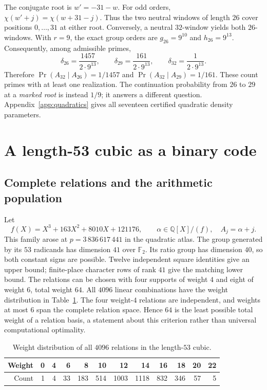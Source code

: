 \documentclass[11pt]{article}
\theoremstyle{definition}\newtheorem{definition}[theorem]{Definition}
\newcommand{\Q}{\mathbb Q}
\newcommand{\Ftwo}{\mathbb F_2}
\newcommand{\Prob}{\operatorname{Pr}}
\begin{document}
The conjugate root is $w'=-31-w$. For odd orders,
$\chi(w'+j)=\chi(w+31-j)$. Thus the two neutral windows of length
$26$ cover positions $0,\ldots,31$ at either root. Conversely, a
neutral $32$-window yields both $26$-windows. With $r=9$, the exact
group orders are $g_{26}=9^{10}$ and $h_{26}=9^{13}$. Consequently,
among admissible primes,
\[
 \delta_{26}=\frac{1457}{2\cdot9^{13}},\qquad
 \delta_{29}=\frac{161}{2\cdot9^{13}},\qquad
 \delta_{32}=\frac1{2\cdot9^{13}}.
\]
Therefore $\Prob(A_{32}\mid A_{26})=1/1457$ and
$\Prob(A_{32}\mid A_{29})=1/161$. These count primes with at least
one realization. The continuation probability from $26$ to $29$
at a \emph{marked root} is instead $1/9$; it answers a different
question. Appendix~\ref{app:quadratics} gives all seventeen certified
quadratic density parameters.

\section{A length-53 cubic as a binary code}\label{sec:code}
\subsection{Complete relations and the arithmetic population}
Let
\[
 f(X)=X^3+163X^2+8010X+121176,
 \qquad \alpha\in\Q[X]/(f),\quad A_j=\alpha+j.
\]
This family arose at $p=3\,836\,617\,441$ in the quadratic atlas.
The group generated by its $53$ radicands has dimension $41$ over
$\Ftwo$. Its ratio group has dimension $40$, so both constant signs
are possible. Twelve independent square identities give an upper
bound; finite-place character rows of rank $41$ give the matching
lower bound. The relations can be chosen with four supports of
weight $4$ and eight of weight $6$, total weight $64$. All $4096$
linear combinations have the weight distribution in
Table~\ref{tab:dual}. The four weight-$4$ relations are independent,
and weights at most $6$ span the complete relation space. Hence
$64$ is the least possible total weight of a relation basis, a
statement about this criterion rather than universal computational
optimality.
\begin{table}[htbp]\centering\small\setlength{\tabcolsep}{4pt}
\caption{Weight distribution of all $4096$ relations in the length-$53$ cubic.}\label{tab:dual}
\begin{tabular}{rrrrrrrrrrrr}
\toprule
Weight & 0 & 4 & 6 & 8 & 10 & 12 & 14 & 16 & 18 & 20 & 22 \\
\midrule
Count & 1 & 4 & 33 & 183 & 514 & 1003 & 1118 & 832 & 346 & 57 & 5 \\
\bottomrule\end{tabular}\end{table}
\end{document}
